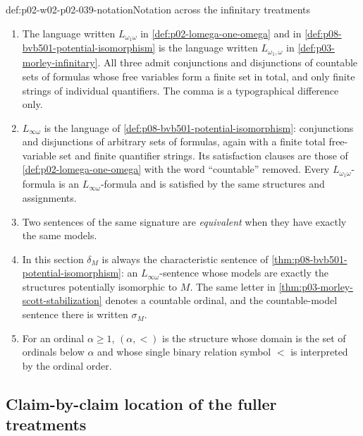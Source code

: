 \begin{hbconvention}{def:p02-w02-p02-039-notation}{Notation across the infinitary treatments}
\begin{enumerate}
\item The language written \(L_{\omega_1\omega}\) in
      \cref{def:p02-lomega-one-omega} and in
      \cref{def:p08-bvb501-potential-isomorphism} is the language written
      \(L_{\omega_1,\omega}\) in \cref{def:p03-morley-infinitary}.  All
      three admit conjunctions and disjunctions of countable sets of
      formulas whose free variables form a finite set in total, and only
      finite strings of individual quantifiers.  The comma is a
      typographical difference only.
\item \(L_{\infty\omega}\) is the language of
      \cref{def:p08-bvb501-potential-isomorphism}: conjunctions and
      disjunctions of arbitrary sets of formulas, again with a finite total
      free-variable set and finite quantifier strings.  Its satisfaction
      clauses are those of \cref{def:p02-lomega-one-omega} with the word
      ``countable'' removed.  Every \(L_{\omega_1\omega}\)-formula is an
      \(L_{\infty\omega}\)-formula and is satisfied by the same structures
      and assignments.
\item Two sentences of the same signature are \emph{equivalent} when they
      have exactly the same models.
\item In this section \(\delta_M\) is always the characteristic sentence of
      \cref{thm:p08-bvb501-potential-isomorphism}: an
      \(L_{\infty\omega}\)-sentence whose models are exactly the structures
      potentially isomorphic to \(M\).  The same letter in
      \cref{thm:p03-morley-scott-stabilization} denotes a countable ordinal,
      and the countable-model sentence there is written \(\sigma_M\).
\item For an ordinal \(\alpha\geq1\), \((\alpha,<)\) is the structure
      whose domain is the set of ordinals below \(\alpha\) and whose single
      binary relation symbol \(<\) is interpreted by the ordinal order.
\end{enumerate}
\end{hbconvention}

\subsection{Claim-by-claim location of the fuller treatments}
\label{sec:p02-w02-p02-039-locations}

